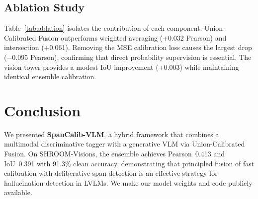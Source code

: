 \documentclass[11pt]{article}
\begin{document}
\subsection{Ablation Study}

Table~\ref{tab:ablation} isolates the contribution of each component. Union-Calibrated Fusion outperforms weighted averaging (+0.032 Pearson) and intersection (+0.061). Removing the MSE calibration loss causes the largest drop ($-0.095$ Pearson), confirming that direct probability supervision is essential. The vision tower provides a modest IoU improvement (+0.003) while maintaining identical ensemble calibration.







\section{Conclusion}

We presented \textbf{SpanCalib-VLM}, a hybrid framework that combines a multimodal discriminative tagger with a generative VLM via Union-Calibrated Fusion. On SHROOM-Visions, the ensemble achieves Pearson~0.413 and IoU~0.391 with 91.3\% clean accuracy, demonstrating that principled fusion of fast calibration with deliberative span detection is an effective strategy for hallucination detection in LVLMs. We make our model weights and code publicly available. 



\end{document}
